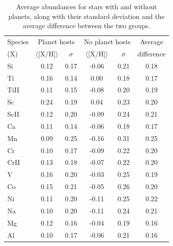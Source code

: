 \documentclass[dvips,12pt,a4paper]{report}
\begin{document}
{{\begin{table}[h!]\footnotesize
\label {avgabund}
\centering
\caption[Average abundances for stars with and without planets ]{Average abundances for stars with and without planets, along with their standard deviation and the average difference between the two groups.} 
\begin{tabular}{ l c c c c c}

\hline
\hline 
Species & \multicolumn {2}{c}{Planet hosts} & \multicolumn {2}{c}{No planet hosts} & Average  \\
(X) & $\langle$[X/H]$\rangle$ & $\sigma$ & $\langle$[X/H]$\rangle$ & $\sigma$ & difference \\
\hline
          Si & 0.12 & 0.17 & -0.06 & 0.21 & 0.18 \\
          Ti & 0.16 & 0.14 & 0.00 & 0.18 & 0.17 \\
        TiII & 0.11 & 0.15 & -0.08 & 0.20 & 0.19\\
          Sc & 0.24 & 0.19 & 0.04 & 0.23 & 0.20\\
        ScII & 0.12 & 0.20 & -0.09 & 0.24 & 0.21\\
          Ca & 0.11 & 0.14 & -0.06 & 0.18 & 0.17\\
          Mn & 0.09 & 0.25 & -0.16 & 0.31 & 0.25\\
          Cr & 0.10 & 0.17 & -0.09 & 0.22 & 0.20\\
        CrII & 0.13 & 0.18 & -0.07 & 0.22 & 0.20\\
           V & 0.16 & 0.20 & -0.03 & 0.25 & 0.19\\
          Co & 0.15 & 0.21 & -0.05 & 0.26 & 0.20\\
          Ni & 0.11 & 0.20 & -0.11 & 0.25 & 0.22\\
          Na & 0.10 & 0.20 & -0.11 & 0.24 & 0.21\\
          Mg & 0.12 & 0.16 & -0.04 & 0.19 & 0.16\\
          Al & 0.10 & 0.17 & -0.06 & 0.21 & 0.16\\
\hline

\end{tabular}
\end{table}

}}
\end{document}
